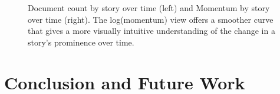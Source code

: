 \documentclass[10pt]{article}
\begin{document}
\begin{figure}
\centering
\mbox{}
\caption{Document count by story over time (left) and Momentum by story over time (right).  The log(momentum) view offers a smoother curve that gives a more visually intuitive understanding of the change in a story's prominence over time. }
\end{figure}

\section {Conclusion and Future Work}
\end{document}

